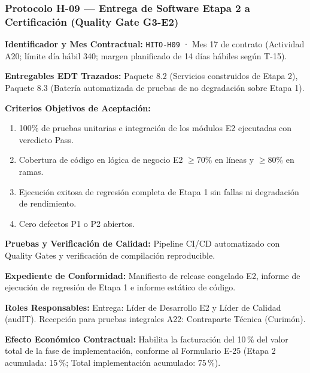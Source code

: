 \subsubsection*{Protocolo H-09 — Entrega de Software Etapa 2 a Certificación (Quality Gate G3-E2)}\label{sec:9-proto-h9}
\par\noindent\textbf{Identificador y Mes Contractual:} \texttt{HITO-H09} · Mes 17 de contrato (Actividad A20; límite día hábil 340; margen planificado de 14 días hábiles según T-15).\par
\par\noindent\textbf{Entregables EDT Trazados:} Paquete 8.2 (Servicios construidos de Etapa 2), Paquete 8.3 (Batería automatizada de pruebas de no degradación sobre Etapa 1).\par
\par\noindent\textbf{Criterios Objetivos de Aceptación:}
\begin{enumerate}
  \item 100\% de pruebas unitarias e integración de los módulos E2 ejecutadas con veredicto Pass.
  \item Cobertura de código en lógica de negocio E2 $\ge 70\%$ en líneas y $\ge 80\%$ en ramas.
  \item Ejecución exitosa de regresión completa de Etapa 1 sin fallas ni degradación de rendimiento.
  \item Cero defectos P1 o P2 abiertos.
\end{enumerate}
\par\noindent\textbf{Pruebas y Verificación de Calidad:} Pipeline CI/CD automatizado con Quality Gates y verificación de compilación reproducible.\par
\par\noindent\textbf{Expediente de Conformidad:} Manifiesto de release congelado E2, informe de ejecución de regresión de Etapa 1 e informe estático de código.\par
\par\noindent\textbf{Roles Responsables:} Entrega: Líder de Desarrollo E2 y Líder de Calidad (audIT). Recepción para pruebas integrales A22: Contraparte Técnica (Curimón).\par
\par\noindent\textbf{Efecto Económico Contractual:} Habilita la facturación del 10\,\% del valor total de la fase de implementación, conforme al Formulario E-25 (Etapa 2 acumulada: 15\,\%; Total implementación acumulado: 75\,\%).\par

